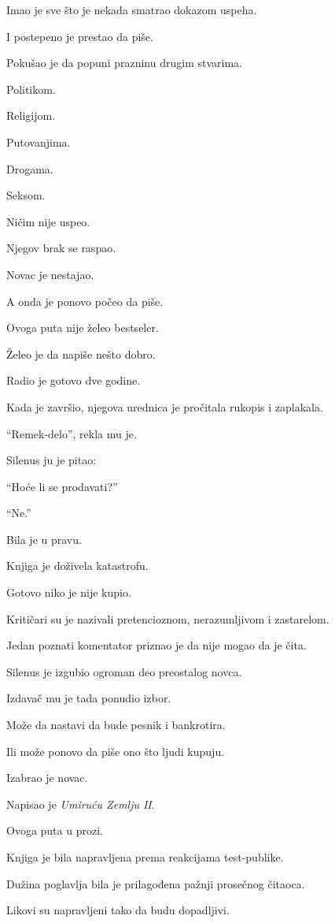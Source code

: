 Imao je sve što je nekada smatrao dokazom uspeha.

I postepeno je prestao da piše.

Pokušao je da popuni prazninu drugim stvarima.

Politikom.

Religijom.

Putovanjima.

Drogama.

Seksom.

Ničim nije uspeo.

Njegov brak se raspao.

Novac je nestajao.

A onda je ponovo počeo da piše.

Ovoga puta nije želeo bestseler.

Želeo je da napiše nešto dobro.

Radio je gotovo dve godine.

Kada je završio, njegova urednica je pročitala rukopis i zaplakala.

``Remek-delo'', rekla mu je.

Silenus ju je pitao:

``Hoće li se prodavati?''

``Ne.''

Bila je u pravu.

Knjiga je doživela katastrofu.

Gotovo niko je nije kupio.

Kritičari su je nazivali pretencioznom, nerazumljivom i zastarelom.

Jedan poznati komentator priznao je da nije mogao da je čita.

Silenus je izgubio ogroman deo preostalog novca.

Izdavač mu je tada ponudio izbor.

Može da nastavi da bude pesnik i bankrotira.

Ili može ponovo da piše ono što ljudi kupuju.

Izabrao je novac.

\bigskip

Napisao je \emph{Umiruću Zemlju II}.

Ovoga puta u prozi.

Knjiga je bila napravljena prema reakcijama test-publike.

Dužina poglavlja bila je prilagođena pažnji prosečnog čitaoca.

Likovi su napravljeni tako da budu dopadljivi.

